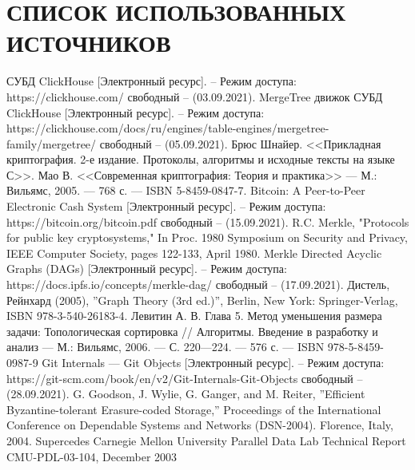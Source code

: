 \section*{СПИСОК ИСПОЛЬЗОВАННЫХ ИСТОЧНИКОВ}

\begingroup
\renewcommand{\section}[2]{}
\begin{thebibliography}{}
    СУБД ClickHouse [Электронный ресурс]. – Режим доступа: 
    https://clickhouse.com/
    свободный – (03.09.2021).
    MergeTree движок СУБД ClickHouse [Электронный ресурс]. – Режим доступа: 
    https://clickhouse.com/docs/ru/engines/table-engines/mergetree-family/mergetree/
    свободный – (05.09.2021).
    Брюс Шнайер. <<Прикладная криптография. 2-е издание. Протоколы, алгоритмы и исходные тексты на языке С>>.
    Мао В. <<Современная криптография: Теория и практика>> — М.: Вильямс, 2005. — 768 с. — ISBN 5-8459-0847-7.
    Bitcoin: A Peer-to-Peer Electronic Cash System [Электронный ресурс]. – Режим доступа: 
    https://bitcoin.org/bitcoin.pdf
    свободный – (15.09.2021).
    R.C. Merkle, "Protocols for public key cryptosystems," In Proc. 1980 Symposium on Security and Privacy, IEEE Computer Society, pages 122-133, April 1980.
    Merkle Directed Acyclic Graphs (DAGs) [Электронный ресурс]. – Режим доступа: 
    https://docs.ipfs.io/concepts/merkle-dag/
    свободный – (17.09.2021).
    Дистель, Рейнхард (2005), ''Graph Theory (3rd ed.)'', Berlin, New York: Springer-Verlag, ISBN 978-3-540-26183-4.
    Левитин А. В. Глава 5. Метод уменьшения размера задачи: Топологическая сортировка // Алгоритмы. Введение в разработку и анализ — М.: Вильямс, 2006. — С. 220—224. — 576 с. — ISBN 978-5-8459-0987-9
    Git Internals --- Git Objects [Электронный ресурс]. – Режим доступа: 
    https://git-scm.com/book/en/v2/Git-Internals-Git-Objects
    свободный – (28.09.2021).
    G. Goodson, J. Wylie, G. Ganger, and M. Reiter, ''Efficient Byzantine-tolerant Erasure-coded Storage,'' Proceedings of the International Conference on Dependable Systems and Networks (DSN-2004). Florence, Italy, 2004. Supercedes Carnegie Mellon University Parallel Data Lab Technical Report CMU-PDL-03-104, December 2003

\end{thebibliography}

